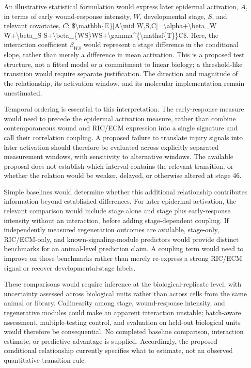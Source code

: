 \documentclass[11pt]{article}
\begin{document}
An illustrative statistical formulation would express later epidermal activation, $A$, in terms of early wound-response intensity, $W$, developmental stage, $S$, and relevant covariates, $C$: \$\textbackslash{}mathbb\{E\}[A\textbackslash{}mid W,S,C]=\textbackslash{}alpha+\textbackslash{}beta\_W W+\textbackslash{}beta\_S S+\textbackslash{}beta\_\{WS\}WS+\textbackslash{}gamma\textasciicircum{}\{\textbackslash{}mathsf\{T\}\}C\$. Here, the interaction coefficient $\beta_{WS}$ would represent a stage difference in the conditional slope, rather than merely a difference in mean activation. This is a proposed test structure, not a fitted model or a commitment to linear biology; a threshold-like transition would require separate justification. The direction and magnitude of the relationship, its activation window, and its molecular implementation remain unestimated.

Temporal ordering is essential to this interpretation. The early-response measure would need to precede the epidermal activation measure, rather than combine contemporaneous wound and RIC/ECM expression into a single signature and call their correlation coupling. A proposed failure to translate injury signals into later activation should therefore be evaluated across explicitly separated measurement windows, with sensitivity to alternative windows. The available proposal does not establish which interval contains the relevant transition, or whether the relation would be weaker, delayed, or otherwise altered at stage 46.

Simple baselines would determine whether this additional relationship contributes information beyond established differences. For later epidermal activation, the relevant comparison would include stage alone and stage plus early-response intensity without an interaction, before adding stage-dependent coupling. If independently measured regeneration outcomes are available, stage-only, RIC/ECM-only, and known-signaling-module predictors would provide distinct benchmarks for an animal-level prediction claim. A coupling term would need to improve on those benchmarks rather than merely re-express a strong RIC/ECM signal or recover developmental-stage labels.

These comparisons would require inference at the biological-replicate level, with uncertainty assessed across biological units rather than across cells from the same animal or library. Collinearity among stage, wound-response intensity, and regenerative modules could make an apparent interaction unstable; batch-aware assessment, multiple-testing control, and evaluation on held-out biological units would therefore be consequential. No completed baseline comparison, interaction estimate, or predictive advantage is supplied. Accordingly, the proposed conditional relationship currently specifies what to estimate, not an observed quantitative transition rule.
\end{document}

